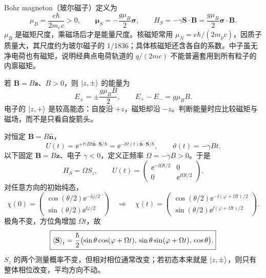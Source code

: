 Bohr magneton（玻尔磁子）定义为
\begin{equation}
  \mu_B=\frac{e\hbar}{2m_ec}>0,\qquad
  \boldsymbol\mu_S=-\frac{g\mu_B}{2}\boldsymbol\sigma,\qquad
  \boxed{H_S=-\gamma\mathbf S\cdot\mathbf B
    =\frac{g\mu_B}{2}\boldsymbol\sigma\cdot\mathbf B.}
\end{equation}
$\mu_B$ 是磁矩尺度，乘磁场后才是能量尺度。核磁矩常用 $\mu_N=e\hbar/(2m_pc)$，因质子质量大，其尺度约为玻尔磁子的 $1/1836$；具体核磁矩还含各自的系数。中子虽无净电荷也有磁矩，说明经典点电荷轨道的 $q/(2mc)$ 不能普遍套用到所有粒子的内禀磁矩。

若 $\mathbf B=B\hat{\mathbf z}$、$B>0$，则 $\left|z,\pm\right\rangle$ 的能量为
\begin{equation}
  E_\pm=\pm\frac{g\mu_B B}{2},\qquad E_+-E_-=g\mu_B B.
\end{equation}
电子的 $\left|z,+\right\rangle$ 是较高能态：自旋沿 $+z$，磁矩却沿 $-z$。判断能量时应比较磁矩与磁场，而不是只看自旋箭头。


对恒定 $\mathbf B=B\hat{\mathbf n}$，
\begin{equation}
  U(t)=\ee^{+\ii\gamma Bt\hat{\mathbf n}\cdot\mathbf S/\hbar}
      =\ee^{-\ii\vartheta(t)\hat{\mathbf n}\cdot\mathbf S/\hbar},
  \qquad \vartheta(t)=-\gamma Bt.
\end{equation}
以下固定 $\mathbf B=B\hat{\mathbf z}$、电子 $\gamma<0$，定义正频率 $\Omega=-\gamma B>0$。于是
\begin{equation}
  H_S=\Omega S_z,\qquad
  U(t)=\begin{pmatrix}\ee^{-\ii\Omega t/2}&0\\0&\ee^{\ii\Omega t/2}\end{pmatrix}.
\end{equation}
对任意方向的初始纯态，
\begin{equation}
  \chi(0)=\begin{pmatrix}\cos(\theta/2)\ee^{-\ii\varphi/2}\\
     \sin(\theta/2)\ee^{\ii\varphi/2}\end{pmatrix}
  \quad\Longrightarrow\quad
  \chi(t)=\begin{pmatrix}\cos(\theta/2)\ee^{-\ii(\varphi+\Omega t)/2}\\
     \sin(\theta/2)\ee^{\ii(\varphi+\Omega t)/2}\end{pmatrix}.
\end{equation}
极角不变，方位角增加 $\Omega t$，故
\begin{equation}
  \boxed{\left\langle \mathbf S \right\rangle_t=\frac\hbar2
  \bigl(\sin\theta\cos(\varphi+\Omega t),\,
        \sin\theta\sin(\varphi+\Omega t),\,\cos\theta\bigr).}
\end{equation}
$S_z$ 的两个测量概率不变，但相对相位通常改变；若初态本来就是 $\left|z,\pm\right\rangle$，则只有整体相位改变，平均方向不动。

